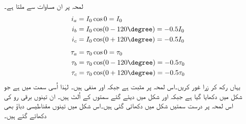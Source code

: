 لمحہ  پر ان مساوات سے ملتا ہے۔
\begin{gather}
\begin{aligned}
i_a&=I_0 \cos 0=I_0\\
i_b&=I_0 \cos (0-120\degree)=-0.5 I_0\\
i_c&=I_0 \cos (0+120\degree)=-0.5 I_0
\end{aligned}
\end{gather}
%
\begin{gather}
\begin{aligned}
\tau_a&=\tau_0 \cos 0=\tau_0\\
\tau_b&=\tau_0 \cos (0-120\degree)=-0.5 \tau_0\\
\tau_c&=\tau_0 \cos (0+120\degree)=-0.5 \tau_0
\end{aligned}
\end{gather}
یہاں رکھ کر زرا غور کریں۔اس لمحہ پر   مثبت ہے جبکہ  اور  منفی ہیں۔ لہٰذا   اُسی سمت میں ہے جو شکل  میں دکھایا گیا ہے جبکہ   اور  شکل میں دیئے گئے سمتوں کے اُلٹ ہیں۔ ان تینوں برقی رو کی اس لمحہ پر درست سمتیں شکل  میں دکھائی گئی ہیں۔اس شکل میں تینوں مقناطیسی دباؤ بھی دکھائے گئے ہیں۔

